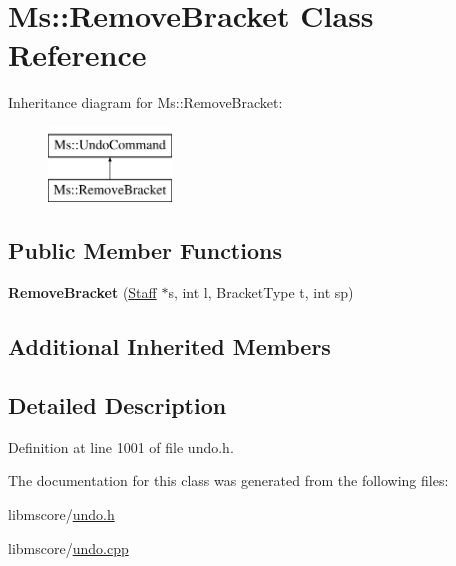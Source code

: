 \hypertarget{class_ms_1_1_remove_bracket}{}\section{Ms\+:\+:Remove\+Bracket Class Reference}
\label{class_ms_1_1_remove_bracket}
Inheritance diagram for Ms\+:\+:Remove\+Bracket\+:\begin{figure}[H]
\begin{center}
\leavevmode
\includegraphics[height=2.000000cm]{class_ms_1_1_remove_bracket}
\end{center}
\end{figure}
\subsection*{Public Member Functions}
\begin{DoxyCompactItemize}
\item 
\mbox{\label{class_ms_1_1_remove_bracket_a5c156377abad8ee8c22dea910989c9b2}} 
{\bfseries Remove\+Bracket} (\hyperlink{class_ms_1_1_staff}{Staff} $\ast$s, int l, Bracket\+Type t, int sp)
\end{DoxyCompactItemize}
\subsection*{Additional Inherited Members}


\subsection{Detailed Description}


Definition at line 1001 of file undo.\+h.



The documentation for this class was generated from the following files\+:\begin{DoxyCompactItemize}
\item 
libmscore/\hyperlink{undo_8h}{undo.\+h}\item 
libmscore/\hyperlink{undo_8cpp}{undo.\+cpp}\end{DoxyCompactItemize}
